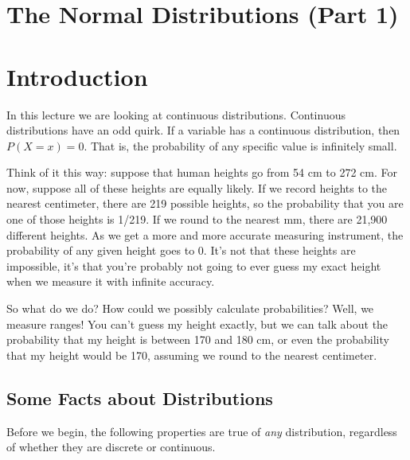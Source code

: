 \documentclass[
  letterpaper,
  DIV=11,
  numbers=noendperiod]{scrreprt}
\begin{document}
\hypertarget{the-normal-distributions-part-1}{%
\chapter{The Normal Distributions (Part
1)}\label{the-normal-distributions-part-1}}

\hypertarget{introduction-2}{%
\chapter{Introduction}\label{introduction-2}}

In this lecture we are looking at continuous distributions. Continuous
distributions have an odd quirk. If a variable has a continuous
distribution, then \(P(X = x) = 0\). That is, the probability of any
specific value is infinitely small.

Think of it this way: suppose that human heights go from 54 cm to 272
cm. For now, suppose all of these heights are equally likely. If we
record heights to the nearest centimeter, there are 219 possible
heights, so the probability that you are one of those heights is 1/219.
If we round to the nearest mm, there are 21,900 different heights. As we
get a more and more accurate measuring instrument, the probability of
any given height goes to 0. It's not that these heights are impossible,
it's that you're probably not going to ever guess my exact height when
we measure it with infinite accuracy.

So what do we do? How could we possibly calculate probabilities? Well,
we measure ranges! You can't guess my height exactly, but we can talk
about the probability that my height is between 170 and 180 cm, or even
the probability that my height would be 170, assuming we round to the
nearest centimeter.

\hypertarget{some-facts-about-distributions}{%
\section{Some Facts about
Distributions}\label{some-facts-about-distributions}}

Before we begin, the following properties are true of \emph{any}
distribution, regardless of whether they are discrete or continuous.
\end{document}
